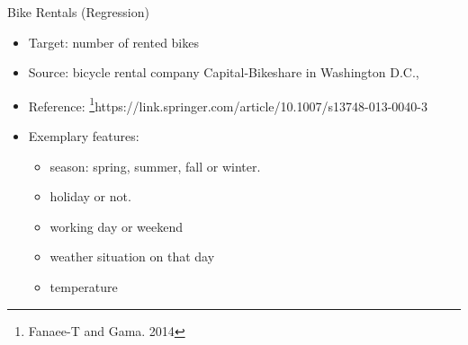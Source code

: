 \documentclass[11pt,compress,t,notes=noshow, xcolor=table]{beamer}
\begin{document}
% 
% 
% 
%      
% 


    \begin{vbframe}{Bike Rentals (Regression)}
        
        \begin{itemize}
            \item Target: number of rented bikes
            \item Source: bicycle rental company Capital-Bikeshare in Washington D.C.,
            \item Reference: \footnote{Fanaee-T and Gama. 2014}{https://link.springer.com/article/10.1007/s13748-013-0040-3}
            \item Exemplary features:
            \begin{itemize}
                \item season: spring, summer, fall or winter.
                \item holiday or not.
                \item working day or weekend
                \item weather situation on that day 
                \item temperature
            \end{itemize}
        \end{itemize}
        
    \end{vbframe}
    
\end{document}
